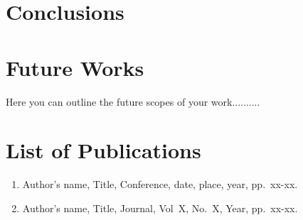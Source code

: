 \documentclass[12pt]{report}
\begin{document}
\newpage

\chapter{Conclusions}

\newpage

\chapter{Future Works}
Here you can outline the future scopes of your work..........
\newpage

\chapter*{List of Publications}
\begin{enumerate}
\item Author's name, Title, Conference, date, place, year, pp.~xx-xx.
\item Author's name, Title, Journal, Vol~X, No.~X, Year, pp.~xx-xx.
\end{enumerate}
\newpage


\end{document}
